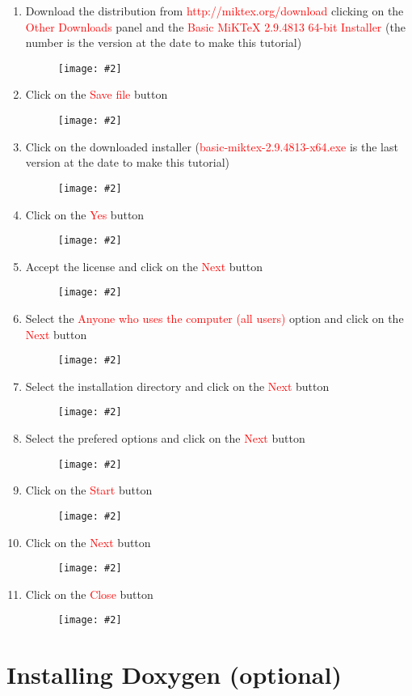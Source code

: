 \documentclass[a4paper]{article}
\newcommand{\FIG}[2]
{
	\begin{figure}[ht!]
	\centering
	\texttt{[image: \#2]}
	\end{figure}
}
\newcommand{\FIGUREB}[1]{\FIG{0.26}{#1}}
\newcommand{\RED}[1] {\textcolor{red}{#1}}
\begin{document}
\begin{enumerate}

\item Download the distribution from \RED{http://miktex.org/download} clicking
on the \RED{Other Downloads} panel and the
\RED{Basic MiKTeX 2.9.4813 64-bit Installer} (the number is the version at the
date to make this tutorial)
\FIGUREB{Latex-1.png}

\clearpage

\item Click on the \RED{Save file} button
\FIGUREB{Latex-2.png}

\item Click on the downloaded installer (\RED{basic-miktex-2.9.4813-x64.exe}
is the last version at the date to make this tutorial)
\FIGUREB{Latex-3.png}

\clearpage

\item Click on the \RED{Yes} button
\FIGUREB{Latex-4.png}

\item Accept the license and click on the \RED{Next} button
\FIGUREB{Latex-5.png}

\clearpage

\item Select the \RED{Anyone who uses the computer (all users)} option and click
on the \RED{Next} button
\FIGUREB{Latex-6.png}

\item Select the installation directory and click on the \RED{Next} button
\FIGUREB{Latex-7.png}

\clearpage

\item Select the prefered options and click on the \RED{Next} button
\FIGUREB{Latex-8.png}

\item Click on the \RED{Start} button
\FIGUREB{Latex-9.png}

\clearpage

\item Click on the \RED{Next} button
\FIGUREB{Latex-10.png}

\item Click on the \RED{Close} button
\FIGUREB{Latex-11.png}

\end{enumerate}

\clearpage

\section{Installing Doxygen (optional)}
\end{document}
